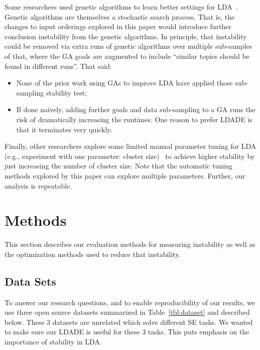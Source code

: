 \documentclass[twocolumn,5p,sort&compress]{elsarticle}
\newcommand{\bi}{\begin{itemize}}
\newcommand{\ei}{\end{itemize}}
\theoremstyle{break}
\begin{document}
Some researchers 
used
genetic
algorithms to learn better settings for LDA~\cite{panichella2013effectively,lohar2013improving,sun2015msr4sm}.
Genetic algorithms are 
themselves a stochastic search process. That is, the changes to 
input orderings explored in this paper would introduce further conclusion instability
from the genetic algorithms.
In principle, that instability could be removed via extra  runs of genetic algorithms 
over multiple sub-samples of that, where the GA goals are augmented to include
``similar topics should be found in different runs''.
That said:
\bi
\item None of the prior work using GAs to improve LDA have applied those sub-sampling stability test;
\item If done naively, adding further goals and data sub-sampling to a GA runs the risk
  of dramatically increasing the runtimes.
One reason to prefer LDADE is that it terminates very quickly.
\ei
Finally, other researchers explore
some limited manual parameter tuning for LDA
(e.g., experiment with one parameter: cluster size)~\cite{galvis2013analysis, tian2009using}
to achieve higher stability by just increasing the number of cluster size.
Note that the automatic tuning methods explored by this paper can
explore multiple parameters. Further, our analysis is repeatable.

\section{Methods}
\label{sect:evaluation}
This section describes our evaluation methods for measuring instability as well as the optimization
methods used to reduce that instability.


\subsection{Data Sets}
To answer our research questions, and to enable reproducibility of our results,
we use three open source datasets summarized in Table~\ref{tbl:dataset} and described
below. These 3 datasets are unrelated which solve different SE tasks. We wanted to make sure our LDADE is useful for these 3 tasks. This puts emphasis on the importance of stability in LDA. 
\end{document}
